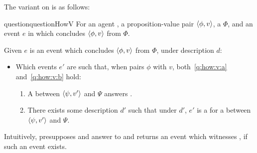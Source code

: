 \begin{note}
  The variant on \qHow{} is as follows:

  \begin{restatable}[\qHowV{}]{question}{questionHowV}
    \label{q:how:v}
    For an agent \vAgent{}, a proposition-value pair \(\langle \phi, v \rangle\), a \poP{} \(\Phi\), and an event \(e\) in which \vAgent{} concludes \(\langle \phi, v \rangle\) from \(\Phi\).

    Given \(e\) is an event which \vAgent{} concludes \(\langle \phi, v \rangle\) from \(\Phi\), under description \(d\):

    \begin{itemize}
    \item
      Which events \(e'\) are such that, when \vAgent{} pairs \(\phi\) with \(v\), both~\ref{q:how:v:a} and~\ref{q:how:v:b} hold:

      \begin{enumerate}[label=\alph*., ref=(\alph*), , series=qHowVdef]
      \item
        \label{q:how:v:a}
        A \ros{} between \(\langle \psi, v' \rangle\) and \({\Psi}\) answers \qWhyV{}.
      \item
        \label{q:how:v:b}
        There exists some description \(d'\) such that under \(d'\), \(e'\) is a  for a \ros{} between \(\langle \psi, v' \rangle\) and \(\Psi\).
      \end{enumerate}
    \end{itemize}
    \vspace{-\baselineskip}
  \end{restatable}

  Intuitively, \qHowV{} presupposes and answer to \qWhyV{} and returns an event which witnesses \ros{}, if such an event exists.
\end{note}

